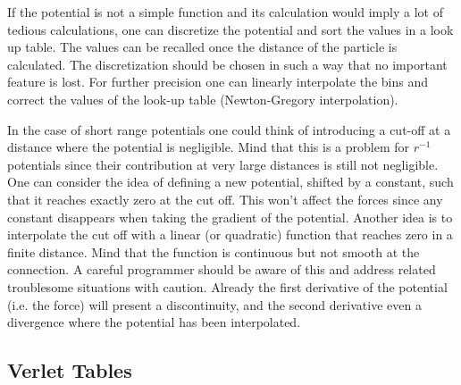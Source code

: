 If the potential is not a simple function and its calculation would imply a lot of tedious calculations, one can discretize the potential and sort the values in a look up table. The values can be recalled once the distance of the particle is calculated. The discretization should be chosen in such a way that no important feature is lost. For further precision one can linearly interpolate the bins and correct the values of the look-up table (Newton-Gregory interpolation).

In the case of short range potentials one could think of introducing a cut-off at a distance where the potential is negligible. Mind that this is a problem for $r^{-1}$ potentials since their contribution at very large distances is still not negligible. One can consider the idea of defining a new potential, shifted by a constant, such that it reaches exactly zero at the cut off. This won't affect the forces since any constant disappears when taking the gradient of the potential. Another idea is to interpolate the cut off with a linear (or quadratic) function that reaches zero in a finite distance. Mind that the function is continuous but not smooth at the connection. A careful programmer should be aware of this and address related troublesome situations with caution. Already the first derivative of the potential (i.e. the force) will present a discontinuity, and the second derivative even a divergence where the potential has been interpolated.
 

\subsection{Verlet Tables}

\vspace{0.1cm}
\noindent




